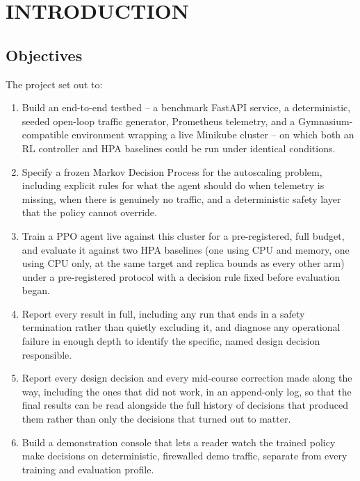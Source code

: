 \chapter{INTRODUCTION}
\label{ch:introduction}

\section{Objectives}
\label{sec:intro-objectives}

The project set out to:
\begin{enumerate}[label=(\roman*)]
  \item Build an end-to-end testbed -- a benchmark FastAPI service, a
    deterministic, seeded open-loop traffic generator, Prometheus
    telemetry, and a Gymnasium-compatible environment wrapping a live
    Minikube cluster -- on which both an RL controller and HPA baselines
    could be run under identical conditions.
  \item Specify a frozen Markov Decision Process for the autoscaling
    problem, including explicit rules for what the agent should do when
    telemetry is missing, when there is genuinely no traffic, and a
    deterministic safety layer that the policy cannot override.
  \item Train a PPO agent live against this cluster for a pre-registered,
    full budget, and evaluate it against two HPA baselines (one using CPU
    and memory, one using CPU only, at the same target and replica bounds
    as every other arm) under a pre-registered protocol with a decision
    rule fixed before evaluation began.
  \item Report every result in full, including any run that ends in a
    safety termination rather than quietly excluding it, and diagnose any
    operational failure in enough depth to identify the specific, named
    design decision responsible.
  \item Report every design decision and every mid-course correction made
    along the way, including the ones that did not work, in an append-only
    log, so that the final results can be read alongside the full history
    of decisions that produced them rather than only the decisions that
    turned out to matter.
  \item Build a demonstration console that lets a reader watch the trained
    policy make decisions on deterministic, firewalled demo traffic,
    separate from every training and evaluation profile.
\end{enumerate}

